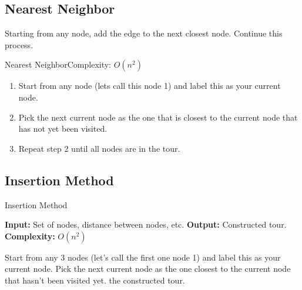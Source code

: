 \subsection{Nearest Neighbor}
Starting from any node, add the edge to the next closest node.  Continue this process.
\begin{general}{Nearest Neighbor}{Complexity: $O(n^2)$}
\label{heuristic:nearestNeighbor}
\begin{enumerate}
\item Start from any node (lets call this node 1) and label this as your current node.
\item Pick the next current node as the one that is closest to the current node that has not yet been visited.
\item Repeat step 2 until all nodes are in the tour.
\end{enumerate}
\end{general}

\subsection{Insertion Method }
\begin{algorithm}
\caption{Insertion Method}
\label{heuristic:insertion}
\begin{algorithmic}[1]
    \State \textbf{Input:} Set of nodes, distance between nodes, etc.
    \State \textbf{Output:} Constructed tour.
    \State \textbf{Complexity:} $O(n^2)$

    \State Start from any 3 nodes (let's call the first one node 1) and label this as your current node.
        \State Pick the next current node as the one closest to the current node that hasn't been visited yet.
    \EndWhile
    \State \Return the constructed tour.
\end{algorithmic}
\end{algorithm}

